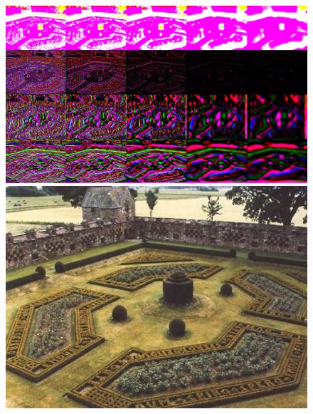 \documentclass[12pt]{article}
\newenvironment{problem}[2][Problem]{\begin{trivlist}
\item[\hskip \labelsep {\bfseries #1}\hskip \labelsep {\bfseries #2.}]}{\end{trivlist}}
\begin{document}
\begin{problem}{1.1}
\begin{figure}
  \centering
  \begin{minipage}[b]{0.45\textwidth}
    \includegraphics[width=\textwidth]{images/2}
  \end{minipage}
  \begin{minipage}[b]{0.35\textwidth}
    \includegraphics[width=\textwidth]{images/1_o}
  \end{minipage}
\end{figure} 

 
 \end{problem}
\end{document}
